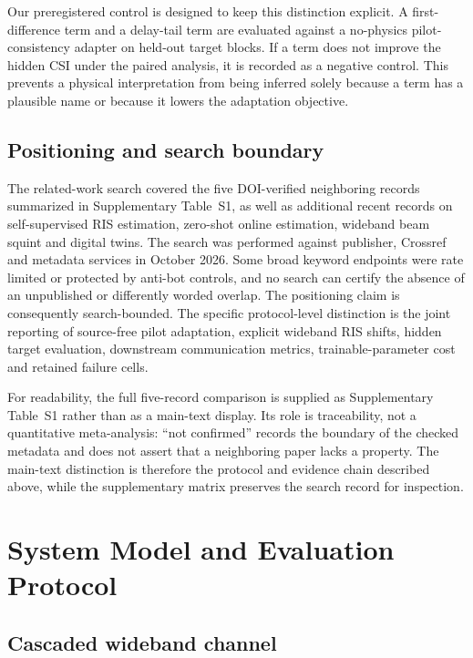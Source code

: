 \documentclass[10pt,twocolumn]{article}
\begin{document}
Our preregistered control is designed to keep this distinction explicit. A first-difference term and a delay-tail term are evaluated against a no-physics pilot-consistency adapter on held-out target blocks. If a term does not improve the hidden CSI under the paired analysis, it is recorded as a negative control. This prevents a physical interpretation from being inferred solely because a term has a plausible name or because it lowers the adaptation objective.

\subsection{Positioning and search boundary}

The related-work search covered the five DOI-verified neighboring records summarized in Supplementary Table~S1, as well as additional recent records on self-supervised RIS estimation, zero-shot online estimation, wideband beam squint and digital twins. The search was performed against publisher, Crossref and metadata services in October 2026. Some broad keyword endpoints were rate limited or protected by anti-bot controls, and no search can certify the absence of an unpublished or differently worded overlap. The positioning claim is consequently search-bounded. The specific protocol-level distinction is the joint reporting of source-free pilot adaptation, explicit wideband RIS shifts, hidden target evaluation, downstream communication metrics, trainable-parameter cost and retained failure cells.

For readability, the full five-record comparison is supplied as Supplementary Table~S1 rather than as a main-text display. Its role is traceability, not a quantitative meta-analysis: ``not confirmed'' records the boundary of the checked metadata and does not assert that a neighboring paper lacks a property. The main-text distinction is therefore the protocol and evidence chain described above, while the supplementary matrix preserves the search record for inspection.

\section{System Model and Evaluation Protocol}

\subsection{Cascaded wideband channel}
\end{document}
